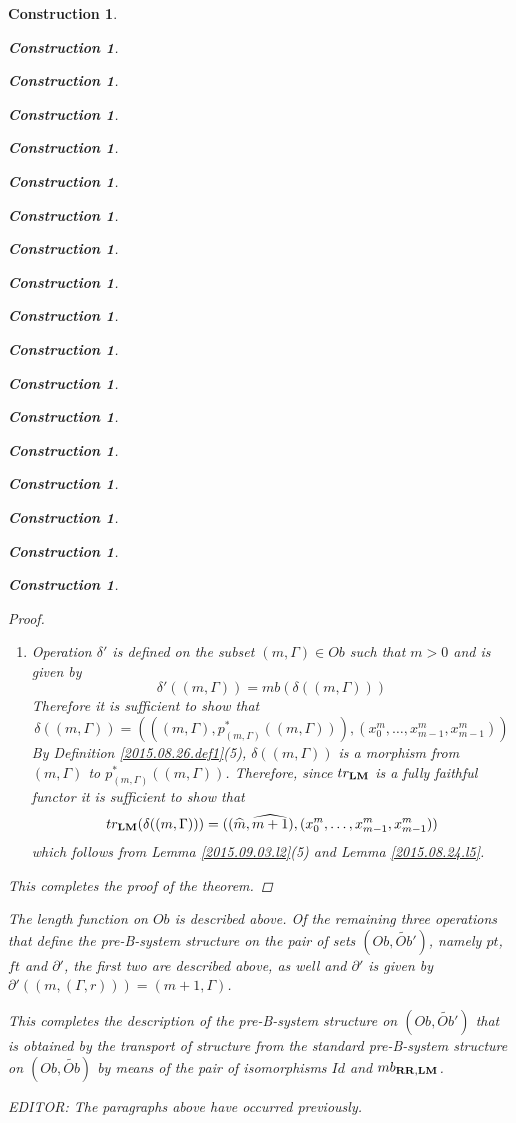 \documentclass[12pt]{amsart}
\newenvironment{eq}{\begin{equation}}{\end{equation}}
\newtheorem{construction}[proposition]{Construction}
\newcommand{\llabel}[1]{\label{#1}}
\newcommand{\wt}{\widetilde}
\newcommand{\wh}{\widehat}
\newcommand{\RR}{{\bf RR}}
\newcommand{\LM}{{\bf LM}}
\begin{document}
\begin{construction}
\begin{construction}
\begin{construction}
\begin{construction}
\begin{construction}
\begin{construction}
\begin{construction}
\begin{construction}
\begin{construction}
\begin{construction}
\begin{construction}
\begin{construction}
\begin{construction}
\begin{construction}
\begin{construction}
\begin{construction}
\begin{construction}
\begin{construction}
\begin{proof}
\begin{enumerate}
\begin{eq}\llabel{2016.01.21.eq1}
\partial(mb^!((n,(\Gamma',s))))>\partial(mb^!(m,(\Gamma,r)))
\end{eq}%
%
and takes values in $\wt{Ob}'$. The inequality (\ref{2016.01.21.eq1}) is equivalent to 
%
$$(n+1,\Gamma')>(m+1,\Gamma)$$
%
which is, in turn, equivalent to the conditions in the theorem. In the computation  below let us sometimes abbreviate $((X,Y),f)$ to $f$. Let
%
$$rr=(x_0^m,\dots,x_{m-1}^m,r)$$
$$ss=(x_0^n,\dots,x_{n-1}^n,s)$$
%
Then the operation itself is given by:
%
$$\wt{S}'((m,(\Gamma,r)),(n,(\Gamma',s)))=mb((mb^!(m,(\Gamma,r)))^*(mb^!((n,(\Gamma',s)))))=mb(rr^*ss)=$$
$$mb((x_0^{n-1},\dots,x^{n-1}_{n-2},(qq^{n-m-1}(rr))(s)))=(n-1,(rr^*((n+1,\Gamma')),(qq^{n-m-1}(rr))(s)))=$$
$$(n-1,(S'((m,(\Gamma,r)),(n+1,\Gamma'))),\theta_{m,n}(r,s)),$$
%
where the third equality is by Lemma \ref{2015.09.03.l1} and the fifth by
(\ref{2016.01.21.eq2}) and the definition of $\theta_{m,n}(r,s)$.
%
\item Operation $\delta'$ is defined on the subset $(m,\Gamma)\in Ob$ such that $m>0$ and is given by
%
$$\delta'((m,\Gamma))=mb(\delta((m,\Gamma)))$$
%
Therefore it is sufficient to show that
%
$$\delta((m,\Gamma))=(((m,\Gamma),p_{(m,\Gamma)}^*((m,\Gamma))),(x_0^m,\dots,x_{m-1}^m,x_{m-1}^m))$$
%
By Definition \ref{2015.08.26.def1}(5), $\delta((m,\Gamma))$ is a morphism from
$(m,\Gamma)$ to $p_{(m,\Gamma)}^*((m,\Gamma))$. Therefore, since $tr_{\LM}$ is
a fully faithful functor it is sufficient to show that
%
$$tr_{\LM}(\delta((m,\Gamma)))=((\wh{m},\wh{m+1}),(x_0^m,\dots,x_{m-1}^m,x_{m-1}^m))$$
%
which follows from Lemma \ref{2015.09.03.l2}(5) and Lemma \ref{2015.08.24.l5}.
%
\end{enumerate}
%
This completes the proof of the theorem. 
\end{proof}
%
The length function on $Ob$ is described above. Of the remaining three
operations that define the pre-B-system structure on the pair of sets
$(Ob,\wt{Ob}')$, namely $pt$, $ft$ and $\partial'$, the first two are described above,
as well and $\partial'$ is given by $\partial'((m,(\Gamma,r)))=(m+1,\Gamma)$.

This completes the description of the pre-B-system structure on $(Ob,\wt{Ob}')$
that is obtained by the transport of structure from the standard pre-B-system
structure on $(Ob,\wt{Ob})$ by means of the pair of isomorphisms $Id$ and
$mb_{\RR,\LM}$.

EDITOR: The paragraphs above have occurred previously.


\end{construction}
\end{construction}
\end{construction}
\end{construction}
\end{construction}
\end{construction}
\end{construction}
\end{construction}
\end{construction}
\end{construction}
\end{construction}
\end{construction}
\end{construction}
\end{construction}
\end{construction}
\end{construction}
\end{construction}
\end{construction}
\end{document}
